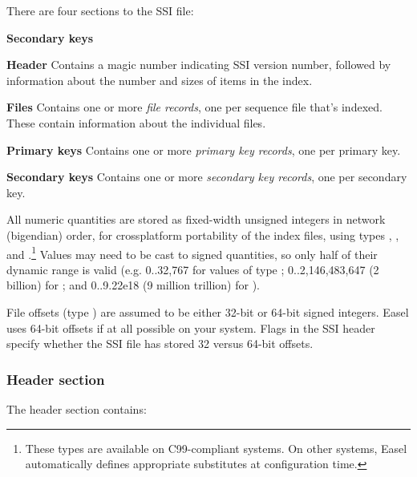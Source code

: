 There are four sections to the SSI file:
\begin{sreitems}{\textbf{Secondary keys}}
\item[\textbf{Header}] 
Contains a magic number indicating SSI version number, followed by
information about the number and sizes of items in the index.

\item[\textbf{Files}]
Contains one or more \emph{file records}, one per sequence file that's
indexed. These contain information about the individual files.

\item[\textbf{Primary keys}]
Contains one or more \emph{primary key records}, one per primary key.

\item[\textbf{Secondary keys}]
Contains one or more \emph{secondary key records}, one per secondary key.
\end{sreitems}

All numeric quantities are stored as fixed-width unsigned integers in
network (bigendian) order, for crossplatform portability of the index
files, using types , , and
.\footnote{These types are available on C99-compliant
systems. On other systems, Easel automatically defines appropriate
substitutes at configuration time.}  Values may need to be cast to
signed quantities, so only half of their dynamic range is valid
(e.g. 0..32,767 for values of type ; 0..2,146,483,647
(2 billion) for ; and 0..9.22e18 (9 million trillion)
for ). 

File offsets (type ) are assumed to be either 32-bit or
64-bit signed integers. Easel uses 64-bit offsets if at all possible
on your system. Flags in the SSI header specify whether the SSI file
has stored 32 versus 64-bit offsets. 

\subsubsection{Header section}

The header section contains:

